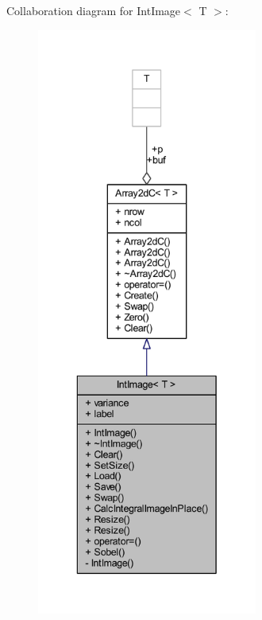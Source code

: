 Collaboration diagram for Int\+Image$<$ T $>$\+:\nopagebreak
\begin{figure}[H]
\begin{center}
\leavevmode
\includegraphics[height=550pt]{class_int_image__coll__graph}
\end{center}
\end{figure}
